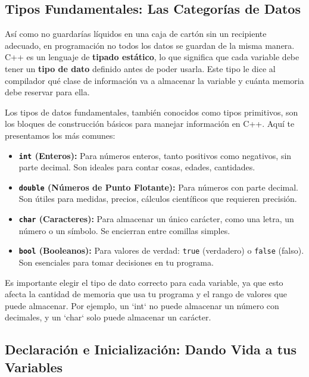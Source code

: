 \subsection{Tipos Fundamentales: Las Categorías de Datos}
\label{subsec:tipos_fundamentales}

Así como no guardarías líquidos en una caja de cartón sin un recipiente adecuado, en programación no todos los datos se guardan de la misma manera. C++ es un lenguaje de \textbf{tipado estático}, lo que significa que cada variable debe tener un \textbf{tipo de dato} definido antes de poder usarla. Este tipo le dice al compilador qué clase de información va a almacenar la variable y cuánta memoria debe reservar para ella.

Los tipos de datos fundamentales, también conocidos como tipos primitivos, son los bloques de construcción básicos para manejar información en C++. Aquí te presentamos los más comunes:

\begin{itemize}
    \item \textbf{\texttt{int} (Enteros):} Para números enteros, tanto positivos como negativos, sin parte decimal. Son ideales para contar cosas, edades, cantidades.
    \item \textbf{\texttt{double} (Números de Punto Flotante):} Para números con parte decimal. Son útiles para medidas, precios, cálculos científicos que requieren precisión.
    \item \textbf{\texttt{char} (Caracteres):} Para almacenar un único carácter, como una letra, un número o un símbolo. Se encierran entre comillas simples.
    \item \textbf{\texttt{bool} (Booleanos):} Para valores de verdad: \texttt{true} (verdadero) o \texttt{false} (falso). Son esenciales para tomar decisiones en tu programa.
\end{itemize}



Es importante elegir el tipo de dato correcto para cada variable, ya que esto afecta la cantidad de memoria que usa tu programa y el rango de valores que puede almacenar. Por ejemplo, un `int` no puede almacenar un número con decimales, y un `char` solo puede almacenar un carácter.

\subsection{Declaración e Inicialización: Dando Vida a tus Variables}
\label{subsec:declaracion_inicializacion}

